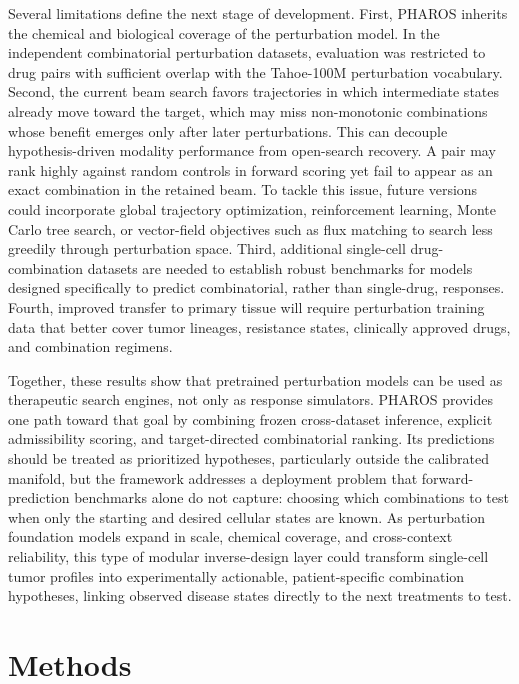 \documentclass[11pt,a4paper]{article}
\begin{document}
Several limitations define the next stage of development. First, PHAROS inherits the chemical and biological coverage of the perturbation model. In the independent combinatorial perturbation datasets, evaluation was restricted to drug pairs with sufficient overlap with the Tahoe-100M perturbation vocabulary. Second, the current beam search favors trajectories in which intermediate states already move toward the target, which may miss non-monotonic combinations whose benefit emerges only after later perturbations. This can decouple hypothesis-driven modality performance from open-search recovery. A pair may rank highly against random controls in forward scoring yet fail to appear as an exact combination in the retained beam. To tackle this issue, future versions could incorporate global trajectory optimization, reinforcement learning, Monte Carlo tree search, or vector-field objectives such as flux matching to search less greedily through perturbation space\cite{Pao-Huang2026}. Third, additional single-cell drug-combination datasets are needed to establish robust benchmarks for models designed specifically to predict combinatorial, rather than single-drug, responses. Fourth, improved transfer to primary tissue will require perturbation training data that better cover tumor lineages, resistance states, clinically approved drugs, and combination regimens. 

Together, these results show that pretrained perturbation models can be used as therapeutic search engines, not only as response simulators. PHAROS provides one path toward that goal by combining frozen cross-dataset inference, explicit admissibility scoring, and target-directed combinatorial ranking. Its predictions should be treated as prioritized hypotheses, particularly outside the calibrated manifold, but the framework addresses a deployment problem that forward-prediction benchmarks alone do not capture: choosing which combinations to test when only the starting and desired cellular states are known. As perturbation foundation models expand in scale, chemical coverage, and cross-context reliability, this type of modular inverse-design layer could transform single-cell tumor profiles into experimentally actionable, patient-specific combination hypotheses, linking observed disease states directly to the next treatments to test.

\section{Methods}\label{sec12}
\end{document}

